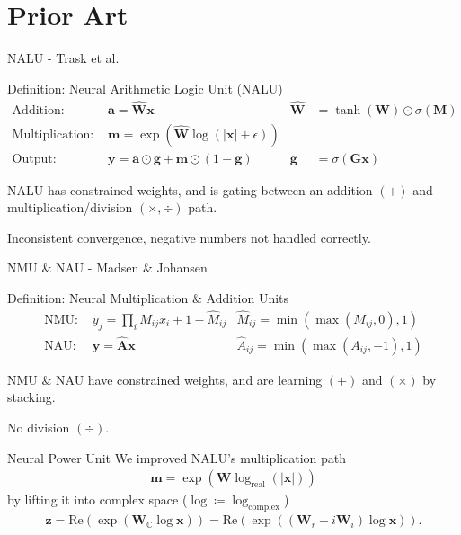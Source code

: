 \documentclass{beamer}
\newcommand{\real}{\text{Re}}
\newcommand{\Wre}{\bm W_{r}}
\newcommand{\Wim}{\bm W_{i}}
\begin{document}
\section{Prior Art}%
\label{sec:prior_art}

\begin{frame}{NALU - Trask et al.}
  \begin{block}{Definition: Neural Arithmetic Logic Unit (NALU)}
  \begin{align*}
    \text{Addition: }       & \bm a = \bm{\hat W} \bm x
                            & \bm{\hat W}& = \tanh(\bm{W}) \odot \sigma(\bm{M}) \\
    \text{Multiplication: } & \bm m = \exp (\bm{\hat W}\log(|\bm x|+\epsilon)) & &\\
    \text{Output: }         & \bm y = \bm a \odot \bm g + \bm m \odot (1-\bm g) 
                            & \bm g& = \sigma(\bm G\bm x)
  \end{align*}
  \end{block}
  NALU has \alert{constrained weights}, and is gating between an
  \alert{addition} $(+)$ and \alert{multiplication/division} $(\times,\div)$ path.

  Inconsistent convergence, negative numbers not handled correctly.
\end{frame}

\begin{frame}{NMU \& NAU - Madsen \& Johansen}
  \begin{block}{Definition: Neural Multiplication \& Addition Units}
    \begin{align}
      \text{NMU: } &y_j = \prod_i \hat M_{ij} x_{i} + 1 - \hat M_{ij}  & \hat M_{ij}=\min(\max(M_{ij}, 0), 1)\\
      \text{NAU: } &\bm y = \bm{\hat{A}} \bm x & \hat A_{ij}=\min(\max(A_{ij}, -1), 1)
    \end{align}
  \end{block}
  NMU \& NAU have \alert{constrained weights}, and are learning $(+)$ and $(\times)$
  by \alert{stacking}.

  No division $(\div)$.
\end{frame}

\begin{frame}{Neural Power Unit}
  We improved NALU's multiplication path
  \begin{align*}
    \bm m = \exp (\bm W\log_{\text{real}}(|\bm x|))
  \end{align*}
  by lifting it into \alert{complex space} ($\log \coloneqq \log_{\text{complex}}$)
  \begin{align*}
    \bm z = \real(\exp(\bm W_\mathbb{C}\log \bm x)) = \real(\exp\left((\Wre + i\Wim) \log\bm x\right)).
  \end{align*}
\end{frame}
\end{document}
